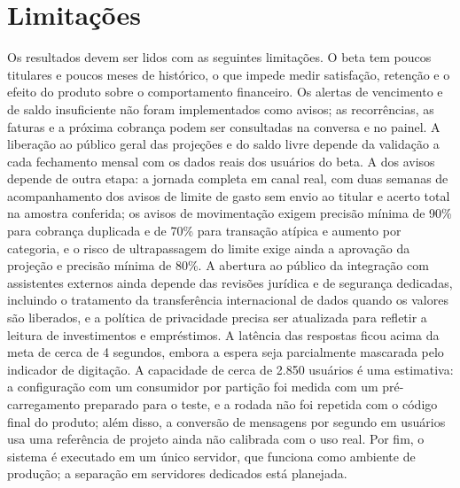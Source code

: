 \section{Limitações}\label{sec:limitacoes}

Os resultados devem ser lidos com as seguintes limitações. O beta tem poucos titulares e poucos meses de histórico, o que impede medir satisfação, retenção e o efeito do produto sobre o comportamento financeiro. Os alertas de vencimento e de saldo insuficiente não foram implementados como avisos; as recorrências, as faturas e a próxima cobrança podem ser consultadas na conversa e no painel. A liberação ao público geral das projeções e do saldo livre depende da validação a cada fechamento mensal com os dados reais dos usuários do beta. A dos avisos depende de outra etapa: a jornada completa em canal real, com duas semanas de acompanhamento dos avisos de limite de gasto sem envio ao titular e acerto total na amostra conferida; os avisos de movimentação exigem precisão mínima de 90\% para cobrança duplicada e de 70\% para transação atípica e aumento por categoria, e o risco de ultrapassagem do limite exige ainda a aprovação da projeção e precisão mínima de 80\%. A abertura ao público da integração com assistentes externos ainda depende das revisões jurídica e de segurança dedicadas, incluindo o tratamento da transferência internacional de dados quando os valores são liberados, e a política de privacidade precisa ser atualizada para refletir a leitura de investimentos e empréstimos. A latência das respostas ficou acima da meta de cerca de 4 segundos, embora a espera seja parcialmente mascarada pelo indicador de digitação. A capacidade de cerca de 2.850 usuários é uma estimativa: a configuração com um consumidor por partição foi medida com um pré-carregamento preparado para o teste, e a rodada não foi repetida com o código final do produto; além disso, a conversão de mensagens por segundo em usuários usa uma referência de projeto ainda não calibrada com o uso real. Por fim, o sistema é executado em um único servidor, que funciona como ambiente de produção; a separação em servidores dedicados está planejada.
